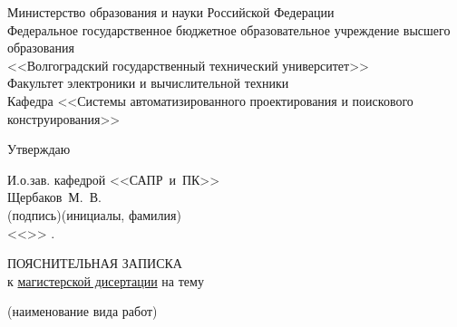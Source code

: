 \begin{titlepage}
    \begin{center}
        Министерство образования и науки Российской Федерации \\
        \vspace{.5cm}
        Федеральное государственное бюджетное образовательное учреждение высшего образования\\
        <<Волгоградский государственный технический университет>>\\
        Факультет электроники и вычислительной техники\\
        \vspace{.5cm}
        Кафедра <<Системы автоматизированного проектирования и поискового конструирования>>
        \vspace{.5cm}
    \end{center}
    \begin{flushright}
        \begin{center}
            \hspace*{10.5em}Утверждаю
        \end{center}
        И.о.зав. кафедрой <<САПР~и~ПК>>\\
        \vspace{0.3cm}
        \underline{\hspace{3cm}}\quad Щербаков~М.~В.\\
        \vspace{-0.2cm}\footnotesize(подпись)\hspace{1.4cm}(инициалы, фамилия)\normalsize\\
        \vspace{0.3cm}
        <<\underline{\hspace{2em}}>> \underline{\hspace{8em}} \the{}.
    \end{flushright}
    \begin{center}
        \large ПОЯСНИТЕЛЬНАЯ ЗАПИСКА\\
        к \underline{\hspace{0.2\textwidth}магистерской дисертации\hspace{7em}} на тему\\
        \vspace{-0.6cm}\begin{center}
            \footnotesize(наименование вида работ)\normalsize
        \end{center}
        \vbox{\vspace{-0.8cm}\underline{\hspace{\textwidth}}}

\end{center}
\end{titlepage}
